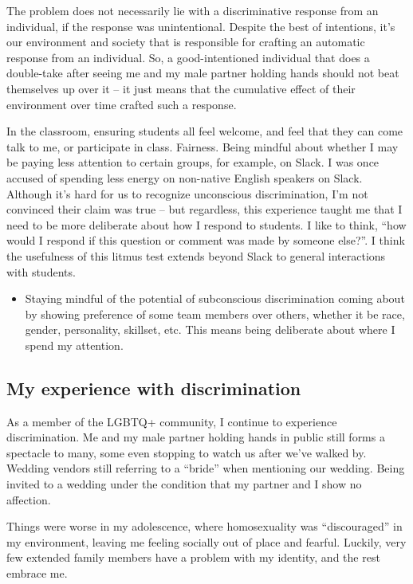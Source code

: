 \documentclass[]{article}
\providecommand{\tightlist}{%
  \setlength{\itemsep}{0pt}\setlength{\parskip}{0pt}}
\begin{document}
The problem does not necessarily lie with a discriminative response from an individual, if the response was unintentional. Despite the best of intentions, it's our environment and society that is responsible for crafting an automatic response from an individual. So, a good-intentioned individual that does a double-take after seeing me and my male partner holding hands should not beat themselves up over it -- it just means that the cumulative effect of their environment over time crafted such a response.

In the classroom, ensuring students all feel welcome, and feel that they can come talk to me, or participate in class. Fairness. Being mindful about whether I may be paying less attention to certain groups, for example, on Slack. I was once accused of spending less energy on non-native English speakers on Slack. Although it's hard for us to recognize unconscious discrimination, I'm not convinced their claim was true -- but regardless, this experience taught me that I need to be more deliberate about how I respond to students. I like to think, ``how would I respond if this question or comment was made by someone else?''. I think the usefulness of this litmus test extends beyond Slack to general interactions with students.

\begin{itemize}
\tightlist
\item
  Staying mindful of the potential of subconscious discrimination coming about by showing preference of some team members over others, whether it be race, gender, personality, skillset, etc. This means being deliberate about where I spend my attention.
\end{itemize}

\hypertarget{my-experience-with-discrimination}{%
\subsection{My experience with discrimination}\label{my-experience-with-discrimination}}

As a member of the LGBTQ+ community, I continue to experience discrimination. Me and my male partner holding hands in public still forms a spectacle to many, some even stopping to watch us after we've walked by. Wedding vendors still referring to a ``bride'' when mentioning our wedding. Being invited to a wedding under the condition that my partner and I show no affection.

Things were worse in my adolescence, where homosexuality was ``discouraged'' in my environment, leaving me feeling socially out of place and fearful. Luckily, very few extended family members have a problem with my identity, and the rest embrace me.
\end{document}
